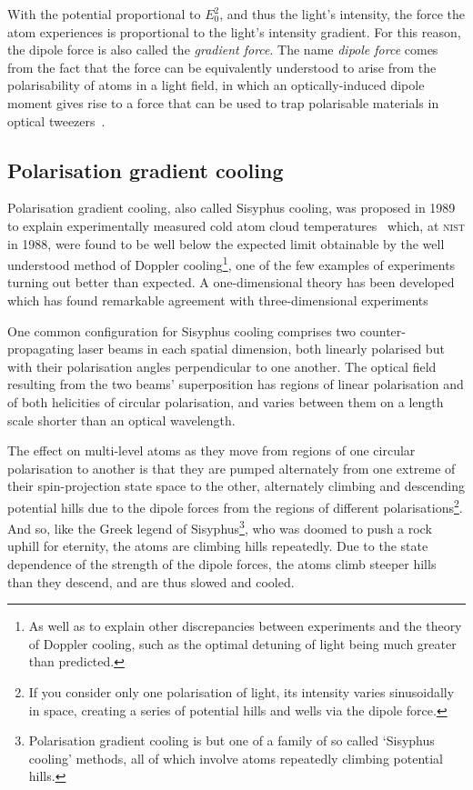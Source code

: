 With the potential proportional to $E_0^2$, and thus the light's intensity, the force the atom experiences is proportional to the light's intensity gradient. For this reason, the dipole force is also called the \emph{gradient force}. The name \emph{dipole force} comes from the fact that the force can be equivalently understood to arise from the polarisability of atoms in a light field, in which an optically-induced dipole moment gives rise to a force that can be used to trap polarisable materials in optical tweezers~\cite{ashkin_acceleration_1970}.

\subsection{Polarisation gradient cooling}

Polarisation gradient cooling, also called Sisyphus cooling, was proposed in 1989~\cite{dalibard_laser_1989, ungar_optical_1989} to explain experimentally measured cold atom cloud temperatures~\cite{lett_optical_1989} which, at \textsc{nist} in 1988, were found to be well below the expected limit obtainable by the well understood method of Doppler cooling\footnote{As well as to explain other discrepancies between experiments and the theory of Doppler cooling, such as the optimal detuning of light being much greater than predicted.}, one of the few examples of experiments turning out better than expected. A one-dimensional theory has been developed~\cite{dalibard_laser_1989} which has found remarkable agreement with three-dimensional experiments~\cite{salomon_laser_1990}

One common configuration for Sisyphus cooling comprises two counter-propagating laser beams in each spatial dimension, both linearly polarised but with their polarisation angles perpendicular to one another. The optical field resulting from the two beams' superposition has regions of linear polarisation and of both helicities of circular polarisation, and varies between them on a length scale shorter than an optical wavelength.

The effect on multi-level atoms as they move from regions of one circular polarisation to another is that they are pumped alternately from one extreme of their spin-projection state space to the other, alternately climbing and descending potential hills due to the dipole forces from the regions of different polarisations\footnote{If you consider only one polarisation of light, its intensity varies sinusoidally in space, creating a series of potential hills and wells via the dipole force.}. And so, like the Greek legend of Sisyphus\footnote{Polarisation gradient cooling is but one of a family of so called `Sisyphus cooling' methods, all of which involve atoms repeatedly climbing potential hills.}, who was doomed to push a rock uphill for eternity, the atoms are climbing hills repeatedly. Due to the state dependence of the strength of the dipole forces, the atoms climb steeper hills than they descend, and are thus slowed and cooled.

